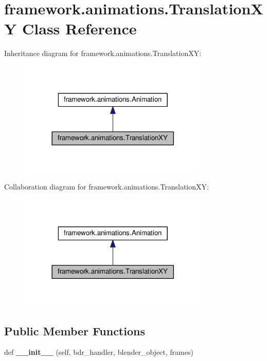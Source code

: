 \hypertarget{classframework_1_1animations_1_1TranslationXY}{}\section{framework.\+animations.\+Translation\+XY Class Reference}
\label{classframework_1_1animations_1_1TranslationXY}


Inheritance diagram for framework.\+animations.\+Translation\+XY\+:
\nopagebreak
\begin{figure}[H]
\begin{center}
\leavevmode
\includegraphics[width=257pt]{classframework_1_1animations_1_1TranslationXY__inherit__graph}
\end{center}
\end{figure}


Collaboration diagram for framework.\+animations.\+Translation\+XY\+:
\nopagebreak
\begin{figure}[H]
\begin{center}
\leavevmode
\includegraphics[width=257pt]{classframework_1_1animations_1_1TranslationXY__coll__graph}
\end{center}
\end{figure}
\subsection*{Public Member Functions}
\begin{DoxyCompactItemize}
\item 
def {\bfseries \+\_\+\+\_\+init\+\_\+\+\_\+} (self, bdr\+\_\+handler, blender\+\_\+object, frames)\hypertarget{classframework_1_1animations_1_1TranslationXY_aed3853e74e9461d11acaabf6d9112b58}{}\label{classframework_1_1animations_1_1TranslationXY_aed3853e74e9461d11acaabf6d9112b58}

\end{DoxyCompactItemize}

